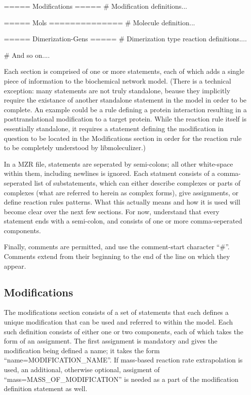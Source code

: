 \begin{ExampleMZR}[title={the caption}, caption={a caption}]
===== Modifications =====
  # Modification definitions...

===== Mols ==============
  # Molecule definition...

=====  Dimerization-Gens =====
  # Dimerization type reaction definitions....

# And so on....
\end{ExampleMZR}
 
Each section is comprised of one or more statements, each of which
adds a single piece of information to the biochemical network
model. (There is a technical exception: many statements are not truly
standalone, beause they implicitly require the existance of another
standalone statement in the model in order to be complete.  An example
could be a rule defining a protein interaction resulting in a
posttranslational modification to a target protein.  While the
reaction rule itself is essentially standalone, it requires a
statement defining the modification in question to be located in the
Modifications section in order for the reaction rule to be completely
understood by libmoleculizer.)

In a MZR file, statements are seperated by semi-colons; all other
white-space within them, including newlines is ignored.  Each statment
consists of a comma-seperated list of substatements, which can either
describe complexes or parts of complexes (what are referred to herein
as complex forms), give assignments, or define reaction rules
patterns.  What this actually means and how it is used will
become clear over the next few sections.  For now, understand that
every statement ends with a semi-colon, and consists of one or more
comma-seperated components.

Finally, comments are permitted, and use the comment-start character
``\#''.  Comments extend from their beginning to the end of the line on
which they appear.

\subsection{Modifications}
The modifications section consists of a set of statements that each
defines a unique modification that can be used and referred to within
the model.  Each such definition consists of either one or two
components, each of which takes the form of an assignment.  The first
assignment is mandatory and gives the modification being defined a
name; it takes the form ``name=MODIFICATION\_NAME''.  If mass-based
reaction rate extrapolation is used, an additional, otherwise
optional, assigment of ``mass=MASS\_OF\_MODIFICATION'' is needed as a
part of the modification definition statement as well.

